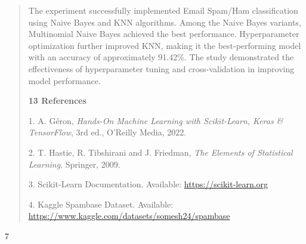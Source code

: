 \documentclass[
]{article}
\begin{document}
\begin{quote}
The experiment successfully implemented Email Spam/Ham classification
using Naive Bayes and KNN algorithms. Among the Naive Bayes variants,
Multinomial Naive Bayes achieved the best performance. Hyperparameter
optimization further improved KNN, making it the best-performing model
with an accuracy of approximately 91.42\%. The study demonstrated the
effectiveness of hyperparameter tuning and cross-validation in improving
model performance.

\textbf{13 References}

1. A. Géron, \emph{Hands-On Machine Learning with Scikit-Learn, Keras \&
TensorFlow}, 3rd ed., O'Reilly Media, 2022.

2. T. Hastie, R. Tibshirani and J. Friedman, \emph{The Elements of
Statistical Learning}. Springer, 2009.

3. Scikit-Learn Documentation. Available: \url{https://scikit-learn.org}

4. Kaggle Spambase Dataset. Available:
\url{https://www.kaggle.com/datasets/somesh24/spambase}
\end{quote}

7
\end{document}
